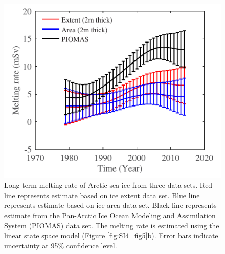 \begin{figure}
	\centering
	\includegraphics{figs_app/FigS6.pdf}
	\caption[Long term melting rate of Arctic sea ice from three data sets.]{Long term melting rate of Arctic sea ice from three data sets.  Red line represents estimate based on ice extent data set.  Blue line represents estimate based on ice area data set. Black line represents estimate from the Pan-Arctic Ice Ocean Modeling and Assimilation System (PIOMAS) data set. The melting rate is estimated using the linear state space model (Figure \ref{fig:SI4_fig5}b).  Error bars indicate uncertainty at 95\% confidence level.}
	\label{fig:SI4_fig6}
\end{figure}

